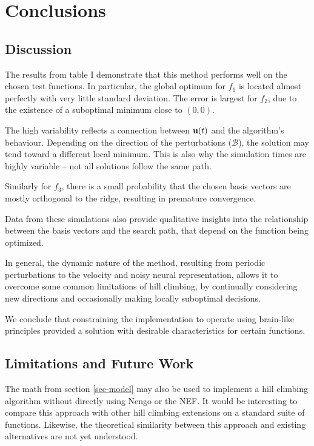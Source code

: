 \documentclass[letterpaper, 10 pt, conference]{ieeeconf}  %
\newcommand{\bolds}[1]{{\bf #1}}
\newenvironment{bottompar}{\par\vspace*{\fill}}{\clearpage}
\begin{document}
\section{Conclusions}

\subsection{Discussion}

The results from table I demonstrate that this method performs well on the chosen test functions. In particular, the global optimum for $f_1$ is located almost perfectly with very little standard deviation. The error is largest for $f_2$, due to the existence of a suboptimal minimum close to $(0, 0)$.

The high variability reflects a connection between $\bolds{u}(t)$ and the algorithm's behaviour. Depending on the direction of the perturbations ($\mathcal{B}$), the solution may tend toward a different local minimum. This is also why the simulation times are highly variable -- not all solutions follow the same path. 

Similarly for $f_3$, there is a small probability that the chosen basis vectors are mostly orthogonal to the ridge, resulting in premature convergence.

Data from these simulations also provide qualitative insights into the relationship between the basis vectors and the search path, that depend on the function being optimized.

In general, the dynamic nature of the method, resulting from periodic perturbations to the velocity and noisy neural representation, allows it to overcome some common limitations of hill climbing, by continually considering new directions and occasionally making locally suboptimal decisions.

We conclude that constraining the implementation to operate using brain-like principles provided a solution with desirable characteristics for certain functions.

\subsection{Limitations and Future Work}

The math from section \ref{sec-model} may also be used to implement a hill climbing algorithm without directly using Nengo or the NEF. It would be interesting to compare this approach with other hill climbing extensions on a standard suite of functions.  Likewise, the theoretical similarity between this approach and existing alternatives are not yet understood.
\end{document}
